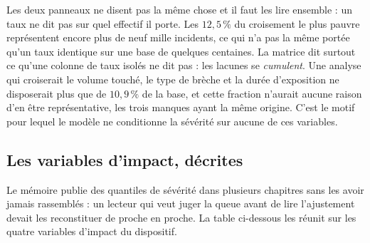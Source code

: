 Les deux panneaux ne disent pas la même chose et il faut les lire ensemble : un taux ne dit
pas sur quel effectif il porte. Les $12{,}5\,\%$ du croisement le plus pauvre représentent encore
plus de neuf mille incidents, ce qui n'a pas la même portée qu'un taux identique sur une base de
quelques centaines. La matrice dit surtout ce qu'une colonne de taux isolés ne dit pas : les
lacunes se \emph{cumulent}. Une analyse qui croiserait le volume touché, le type de brèche et la durée
d'exposition ne disposerait plus que de $10{,}9\,\%$ de la base, et cette fraction n'aurait aucune
raison d'en être représentative, les trois manques ayant la même origine. C'est le motif pour lequel le modèle ne conditionne la sévérité
sur aucune de ces variables.

\subsection{Les variables d'impact, décrites}
\label{subsec:describe-impact}

Le mémoire publie des quantiles de sévérité dans plusieurs chapitres sans les avoir jamais
rassemblés : un lecteur qui veut juger la queue avant de lire l'ajustement devait les
reconstituer de proche en proche. La table ci-dessous les réunit sur les quatre variables
d'impact du dispositif.

